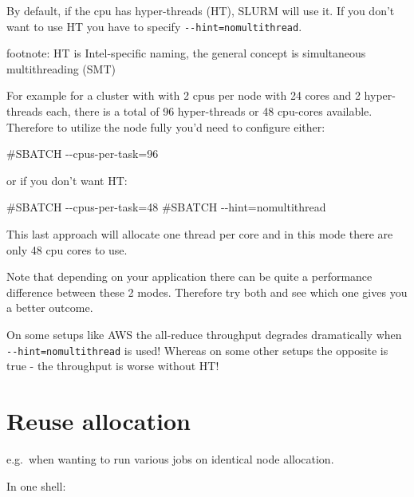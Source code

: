 \documentclass[
]{report}
\newenvironment{Shaded}{\begin{snugshade}}{\end{snugshade}}
\newcommand{\AttributeTok}[1]{\textcolor[rgb]{0.40,0.45,0.13}{#1}}
\newcommand{\BuiltInTok}[1]{\textcolor[rgb]{0.00,0.23,0.31}{#1}}
\newcommand{\CommentTok}[1]{\textcolor[rgb]{0.37,0.37,0.37}{#1}}
\newcommand{\ExtensionTok}[1]{\textcolor[rgb]{0.00,0.23,0.31}{#1}}
\newcommand{\NormalTok}[1]{\textcolor[rgb]{0.00,0.23,0.31}{#1}}
\newcommand{\OperatorTok}[1]{\textcolor[rgb]{0.37,0.37,0.37}{#1}}
\newcommand{\VariableTok}[1]{\textcolor[rgb]{0.07,0.07,0.07}{#1}}
\begin{document}
By default, if the cpu has hyper-threads (HT), SLURM will use it. If you
don't want to use HT you have to specify
\texttt{-\/-hint=nomultithread}.

footnote: HT is Intel-specific naming, the general concept is
simultaneous multithreading (SMT)

For example for a cluster with with 2 cpus per node with 24 cores and 2
hyper-threads each, there is a total of 96 hyper-threads or 48 cpu-cores
available. Therefore to utilize the node fully you'd need to configure
either:

\begin{Shaded}
\begin{Highlighting}[]
\CommentTok{\#SBATCH {-}{-}cpus{-}per{-}task=96}
\end{Highlighting}
\end{Shaded}

or if you don't want HT:

\begin{Shaded}
\begin{Highlighting}[]
\CommentTok{\#SBATCH {-}{-}cpus{-}per{-}task=48}
\CommentTok{\#SBATCH {-}{-}hint=nomultithread}
\end{Highlighting}
\end{Shaded}

This last approach will allocate one thread per core and in this mode
there are only 48 cpu cores to use.

Note that depending on your application there can be quite a performance
difference between these 2 modes. Therefore try both and see which one
gives you a better outcome.

On some setups like AWS the all-reduce throughput degrades dramatically
when \texttt{-\/-hint=nomultithread} is used! Whereas on some other
setups the opposite is true - the throughput is worse without HT!

\section{Reuse allocation}\label{reuse-allocation}

e.g.~when wanting to run various jobs on identical node allocation.

In one shell:

\begin{Shaded}
\end{Shaded}
\end{document}

